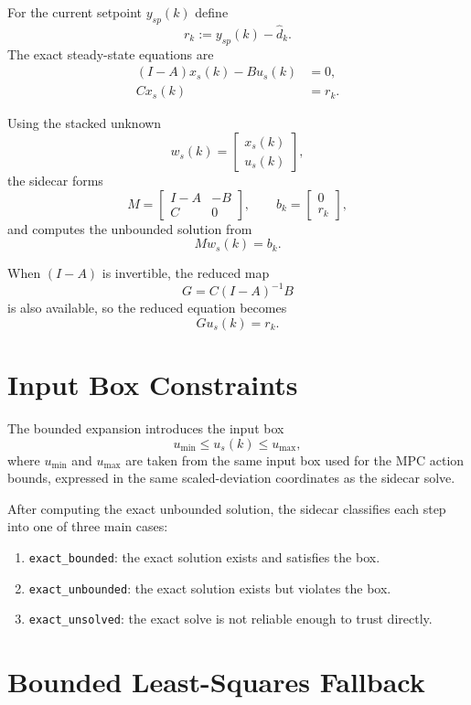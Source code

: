 \documentclass[11pt]{article}
\begin{document}
For the current setpoint $y_{sp}(k)$ define
\[
r_k := y_{sp}(k) - \hat d_k.
\]
The exact steady-state equations are
\begin{align}
(I-A)x_s(k) - Bu_s(k) &= 0, \\
Cx_s(k) &= r_k.
\end{align}

Using the stacked unknown
\[
w_s(k) = \begin{bmatrix}x_s(k) \\ u_s(k)\end{bmatrix},
\]
the sidecar forms
\[
M = \begin{bmatrix}I-A & -B \\ C & 0\end{bmatrix}, \qquad
b_k = \begin{bmatrix}0 \\ r_k\end{bmatrix},
\]
and computes the unbounded solution from
\[
M w_s(k) = b_k.
\]

When $(I-A)$ is invertible, the reduced map
\[
G = C(I-A)^{-1}B
\]
is also available, so the reduced equation becomes
\[
G u_s(k) = r_k.
\]

\section{Input Box Constraints}

The bounded expansion introduces the input box
\[
u_{\min} \le u_s(k) \le u_{\max},
\]
where $u_{\min}$ and $u_{\max}$ are taken from the same input box used for the MPC action bounds, expressed in the same scaled-deviation coordinates as the sidecar solve.

After computing the exact unbounded solution, the sidecar classifies each step into one of three main cases:
\begin{enumerate}
\item \texttt{exact\_bounded}: the exact solution exists and satisfies the box.
\item \texttt{exact\_unbounded}: the exact solution exists but violates the box.
\item \texttt{exact\_unsolved}: the exact solve is not reliable enough to trust directly.
\end{enumerate}

\section{Bounded Least-Squares Fallback}
\end{document}
